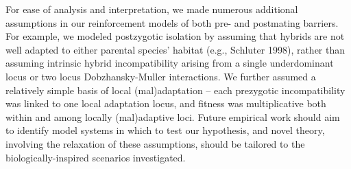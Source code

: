 \documentclass[11pt]{article}
\begin{document}
For ease of analysis and interpretation, we made numerous additional assumptions in our reinforcement models of both pre- and postmating barriers.  
For example, we modeled postzygotic isolation by assuming that hybrids are not well adapted to either parental species' habitat (e.g., Schluter 1998), rather than assuming intrinsic hybrid incompatibility arising from a single underdominant locus or two locus Dobzhansky-Muller interactions.  
We further assumed a relatively simple basis of local (mal)adaptation -- each prezygotic incompatibility was linked to one local adaptation locus, and fitness was multiplicative both within and among locally (mal)adaptive loci. 
Future empirical work should aim to identify model systems in which to test our hypothesis, and novel theory, involving the relaxation of these assumptions, should be tailored to the biologically-inspired scenarios investigated. 


\end{document}
